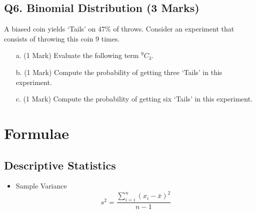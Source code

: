 \documentclass[a4paper,12pt]{article}
\begin{document}
\subsection*{Q6. Binomial Distribution (3 Marks) } %
A biased coin yields `Tails' on $47\%$ of throws. Consider an experiment that consists of throwing this coin 9 times.
\begin{itemize}
\item[a.] (1 Mark) Evaluate the following term $^{9}C_3$.
\item[b.] (1 Mark) Compute the probability of getting three `Tails' in this experiment.
\item[c.] (1 Mark) Compute the probability of getting six `Tails' in this experiment.
\end{itemize}
\bigskip




\newpage
\section*{Formulae}
\subsection*{Descriptive Statistics}
\begin{itemize}
\item Sample Variance
\begin{equation*}
s^2 = \frac{\sum^{n}_{i=i} (x_i-\bar{x})^2}{n-1}
\end{equation*}
\end{itemize}
\end{document}
